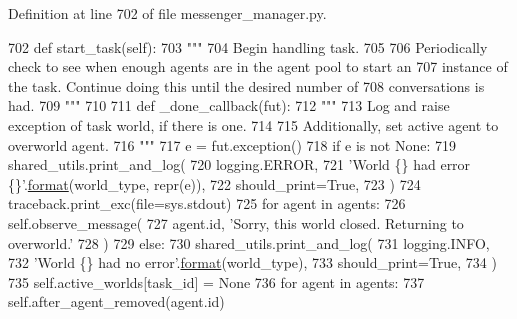 Definition at line 702 of file messenger\+\_\+manager.\+py.


\begin{DoxyCode}
702     \textcolor{keyword}{def }start\_task(self):
703         \textcolor{stringliteral}{"""}
704 \textcolor{stringliteral}{        Begin handling task.}
705 \textcolor{stringliteral}{}
706 \textcolor{stringliteral}{        Periodically check to see when enough agents are in the agent pool to start an}
707 \textcolor{stringliteral}{        instance of the task. Continue doing this until the desired number of}
708 \textcolor{stringliteral}{        conversations is had.}
709 \textcolor{stringliteral}{        """}
710 
711         \textcolor{keyword}{def }\_done\_callback(fut):
712             \textcolor{stringliteral}{"""}
713 \textcolor{stringliteral}{            Log and raise exception of task world, if there is one.}
714 \textcolor{stringliteral}{}
715 \textcolor{stringliteral}{            Additionally, set active agent to overworld agent.}
716 \textcolor{stringliteral}{            """}
717             e = fut.exception()
718             \textcolor{keywordflow}{if} e \textcolor{keywordflow}{is} \textcolor{keywordflow}{not} \textcolor{keywordtype}{None}:
719                 shared\_utils.print\_and\_log(
720                     logging.ERROR,
721                     \textcolor{stringliteral}{'World \{\} had error \{\}'}.\hyperlink{namespaceparlai_1_1chat__service_1_1services_1_1messenger_1_1shared__utils_a32e2e2022b824fbaf80c747160b52a76}{format}(world\_type, repr(e)),
722                     should\_print=\textcolor{keyword}{True},
723                 )
724                 traceback.print\_exc(file=sys.stdout)
725                 \textcolor{keywordflow}{for} agent \textcolor{keywordflow}{in} agents:
726                     self.observe\_message(
727                         agent.id, \textcolor{stringliteral}{'Sorry, this world closed. Returning to overworld.'}
728                     )
729             \textcolor{keywordflow}{else}:
730                 shared\_utils.print\_and\_log(
731                     logging.INFO,
732                     \textcolor{stringliteral}{'World \{\} had no error'}.\hyperlink{namespaceparlai_1_1chat__service_1_1services_1_1messenger_1_1shared__utils_a32e2e2022b824fbaf80c747160b52a76}{format}(world\_type),
733                     should\_print=\textcolor{keyword}{True},
734                 )
735             self.active\_worlds[task\_id] = \textcolor{keywordtype}{None}
736             \textcolor{keywordflow}{for} agent \textcolor{keywordflow}{in} agents:
737                 self.after\_agent\_removed(agent.id)

\end{DoxyCode}

